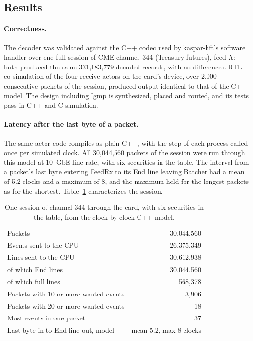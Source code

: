 \documentclass[11pt]{article}
\begin{document}
\subsection{Results}
\label{sec:results}

\paragraph{Correctness.} The decoder was validated against the C++ codec used
by kaspar-hft's software handler over one full session of CME channel~344
(Treasury futures), feed A: both produced the same 331{,}183{,}779 decoded
records, with no differences. RTL co-simulation of the four receive actors on
the card's device, over 2{,}000 consecutive packets of the session, produced
output identical to that of the C++ model. The design including Igmp is synthesized, placed and routed, and its tests
pass in C++ and C simulation.

\paragraph{Latency after the last byte of a packet.} The same actor code compiles as plain
C++, with the step of each process called once per simulated clock. All
30{,}044{,}560 packets of the session were run through this model at 10~GbE
line rate, with six securities in the table. The interval from a packet's last
byte entering FeedRx to its End line leaving Batcher had a mean of 5.2 clocks
and a maximum of 8, and the maximum held for the longest packets as for the
shortest. Table~\ref{tab:session} characterizes the session.

\begin{table}[h]
\centering
\caption{One session of channel 344 through the card, with six securities in
the table, from the clock-by-clock C++ model.}
\label{tab:session}
\small
\begin{tabular}{p{7.0cm} r}
\toprule
Packets & 30{,}044{,}560 \\
Events sent to the CPU & 26{,}375{,}349 \\
Lines sent to the CPU & 30{,}612{,}938 \\
\quad of which End lines & 30{,}044{,}560 \\
\quad of which full lines & 568{,}378 \\
Packets with 10 or more wanted events & 3{,}906 \\
Packets with 20 or more wanted events & 18 \\
Most events in one packet & 37 \\
Last byte in to End line out, model & mean 5.2, max 8 clocks \\
\bottomrule
\end{tabular}
\end{table}
\end{document}
